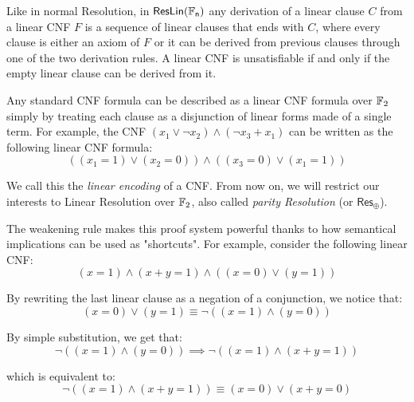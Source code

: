 Like in normal Resolution, in $\mathsf{ResLin(\mathbb{F}_n)}$ any derivation of a linear clause $C$ from a linear CNF $F$ is a sequence of linear clauses that ends with $C$, where every clause is either an axiom of $F$ or it can be derived from previous clauses through one of the two derivation rules. A linear CNF is unsatisfiable if and only if the empty linear clause can be derived from it. 

Any standard CNF formula can be described as a linear CNF formula over $\mathbb{F}_2$ simply by treating each clause as a disjunction of linear forms made of a single term. For example, the CNF $(x_1 \lor \lnot{x_2}) \land (\lnot{x_3} + x_1)$ can be written as the following linear CNF formula:
\[((x_1 = 1) \lor (x_2 = 0)) \land ((x_3 = 0) \lor (x_1 = 1))\]

We call this the \textit{linear encoding} of a CNF. From now on, we will restrict our interests to Linear Resolution over $\mathbb{F}_2$, also called \textit{parity Resolution} (or $\mathsf{Res}_\oplus$).

The weakening rule makes this proof system powerful thanks to how semantical implications can be used as "shortcuts". For example, consider the following linear CNF:
\[(x = 1) \land (x+y = 1) \land ((x = 0) \lor (y = 1))\]

By rewriting the last linear clause as a negation of a conjunction, we notice that:
\[(x = 0) \lor (y = 1) \equiv \lnot ((x = 1) \land (y = 0))\]

By simple substitution, we get that:
\[\lnot ((x = 1) \land (y = 0)) \implies  \lnot ((x = 1) \land (x+y = 1))\]

which is equivalent to:
\[\lnot ((x = 1) \land (x+y = 1)) \equiv (x = 0) \lor (x+y = 0)\]

